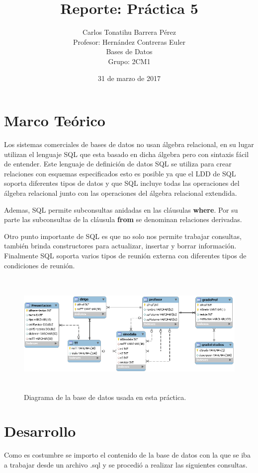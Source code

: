 \documentclass[12pt, titlepage]{article}
\title{Reporte: Práctica 5}
\author{Carlos Tonatihu Barrera Pérez \\ Profesor: Hernández Contreras Euler \\ Bases de Datos \\ Grupo: 2CM1 }
\date{31 de marzo de 2017}
\begin{document}
	\maketitle
	\tableofcontents
	\section{Marco Teórico}
	Los sistemas comerciales de bases de datos no usan álgebra relacional, en su lugar utilizan el lenguaje SQL que esta basado en dicha álgebra pero con sintaxis fácil de entender.
	Este lenguaje de definición de datos SQL se utiliza para crear relaciones con esquemas especificados esto es posible ya que el LDD de SQL soporta diferentes tipos de datos y que SQL incluye todas las operaciones del álgebra relacional junto con las operaciones del álgebra relacional extendida.\cite{LIBRO}
	
	Ademas, SQL permite subconsultas anidadas en las cláusulas \textbf{where}. Por su parte las subconsultas de la cláusula \textbf{from} se denominan relaciones derivadas.
	
	Otro punto importante de SQL es que no solo nos permite trabajar consultas, también brinda constructores para actualizar, insertar y borrar información. Finalmente SQL soporta varios tipos de reunión externa con diferentes tipos de condiciones de reunión.\cite{LIBRO}
	
	 \begin{figure}[H]
		\begin{center}
			\includegraphics[width=16cm, height=6cm]{img/tt.png}
			\caption{Diagrama de la base de datos usada en esta práctica.}
			\label{fig:home}
		\end{center}
	\end{figure}
\newpage
	\section{Desarrollo}
	Como es costumbre se importo el contenido de la base de datos con la que se iba a trabajar desde un archivo .sql y se procedió a realizar las siguientes consultas.
	
\end{document}
